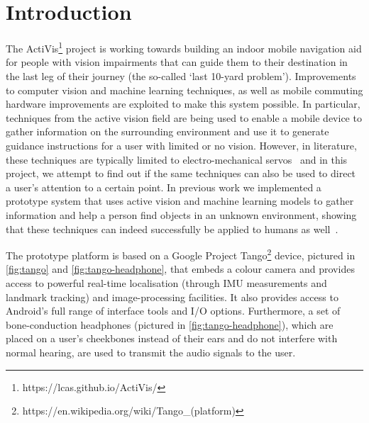 \documentclass{article}
\begin{document}
\section{Introduction}

The ActiVis\footnote{https://lcas.github.io/ActiVis/} project is working towards building an indoor mobile navigation aid for people with vision impairments that can guide them to their destination in the last leg of their journey (the so-called `last 10-yard problem').
Improvements to computer vision and machine learning techniques, as well as mobile commuting hardware improvements are exploited to make this system possible.
In particular, techniques from the active vision field are being used to enable a mobile device to gather information on the surrounding environment and use it to generate guidance instructions for a user with limited or no vision.
However, in literature, these techniques are typically limited to electro-mechanical servos~\cite{bajcsy2018revisiting} and in this project, we attempt to find out if the same techniques can also be used to direct a user's attention to a certain point. 
In previous work we implemented a prototype system that uses active vision and machine learning models to gather information and help a person find objects in an unknown environment, showing that these techniques can indeed successfully be applied to humans as well~\cite{lock2019active}.

The prototype platform is based on a Google Project Tango\footnote{https://en.wikipedia.org/wiki/Tango\_(platform)} device, pictured in \cref{fig:tango} and \cref{fig:tango-headphone}, that embeds a colour camera and provides access to powerful real-time localisation (through IMU measurements and landmark tracking) and image-processing facilities. 
It also provides access to Android's full range of interface tools and I/O options. 
Furthermore, a set of bone-conduction headphones (pictured in \cref{fig:tango-headphone}), which are placed on a user's cheekbones instead of their ears and do not interfere with normal hearing, are used to transmit the audio signals to the user.
\end{document}
